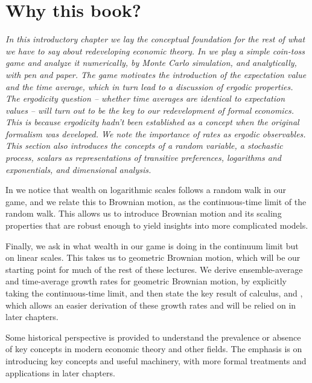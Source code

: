 \chapter{Why this book?}
{\it In this introductory chapter we lay the conceptual foundation for the rest 
of what we have to say about redeveloping economic theory. In  we play a simple coin-toss game and analyze it 
numerically, by Monte Carlo simulation, and analytically, with pen and paper. The game motivates the 
introduction of the expectation value and the time average, which in turn 
lead to a discussion of ergodic properties. The ergodicity question  -- whether time averages are identical to expectation values -- will turn out to be the key to our redevelopment of formal economics. This is because ergodicity hadn't been established as a concept when the original formalism was developed. We note the importance of rates as ergodic observables.
This section also introduces the concepts of a random variable, a stochastic process, scalars as representations of transitive preferences, logarithms and exponentials, and dimensional analysis.

In  we notice that wealth on logarithmic scales follows a random walk in our game, and we relate this to Brownian motion, as the continuous-time limit of the random walk. This allows us to introduce Brownian motion and its scaling properties that are robust enough to yield insights into more complicated models.

Finally, we ask in  what wealth in our game is doing in the continuum limit but on linear scales. This takes us to geometric Brownian motion, which will be our starting point for much of the rest of these lectures. We derive ensemble-average and time-average growth rates for geometric Brownian motion, by explicitly taking the continuous-time limit, and then state the key result of \Ito calculus,  and , which allows an easier derivation of these growth rates and will be relied on in later chapters.

Some historical perspective is provided to understand the prevalence or
absence of key concepts in modern economic theory and other fields.
The emphasis is on introducing key concepts and useful machinery, with more formal treatments and applications
in later chapters.}
\newpage

